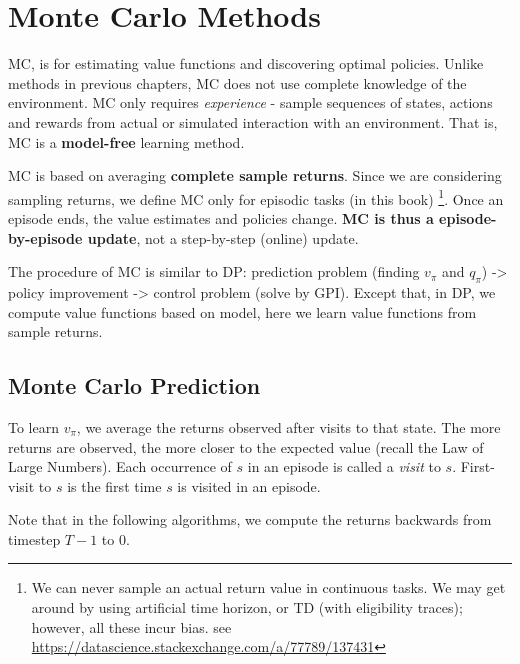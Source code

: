 \documentclass[sutton_barto_notes.tex]{subfiles}
\begin{document}
\newpage
\section{Monte Carlo Methods}

MC, is for estimating value functions and discovering optimal policies. Unlike methods in previous chapters, MC does not use complete knowledge of the environment. MC only requires \textit{experience} - sample sequences of states, actions and rewards from actual or simulated interaction with an environment. That is, MC is a \textbf{model-free} learning method.

MC is based on averaging \textbf{complete sample returns}. Since we are considering sampling returns, we define MC only for episodic tasks (in this book) \footnote{We can never sample an actual return value in continuous tasks. We may get around by using artificial time horizon, or TD (with eligibility traces); however, all these incur bias. see \url{https://datascience.stackexchange.com/a/77789/137431}}. Once an episode ends, the value estimates and policies change. \textbf{MC is thus a episode-by-episode update}, not a step-by-step (online) update.

The procedure of MC is similar to DP: prediction problem (finding $v_\pi$ and $q_\pi$) -> policy improvement -> control problem (solve by GPI). Except that, in DP, we compute value functions based on model, here we learn value functions from sample returns.

\subsection{Monte Carlo Prediction}

To learn $v_\pi$, we average the returns observed after visits to that state. The more returns are observed, the more closer to the expected value (recall the Law of Large Numbers). Each occurrence of $s$ in an episode is called a \textit{visit} to $s$. First-visit to $s$ is the first time $s$ is visited in an episode.

Note that in the following algorithms, we compute the returns backwards from timestep $T-1$ to $0$.
\end{document}

